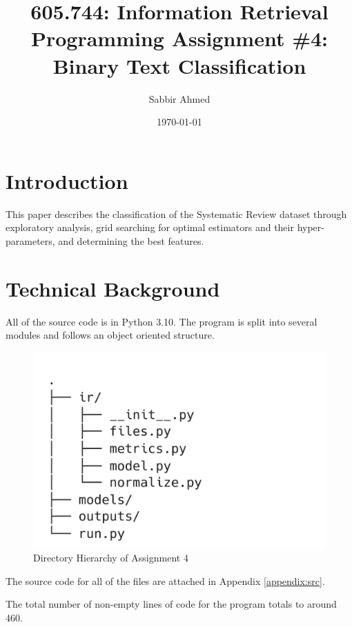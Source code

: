 \documentclass[11pt]{article}
\title{605.744: Information Retrieval \\ Programming Assignment \#4: Binary Text Classification}
\author{Sabbir Ahmed}
\date{\today}
\begin{document}
\maketitle	
\tableofcontents
\clearpage
\newpage

\section{Introduction}
This paper describes the classification of the Systematic Review dataset through exploratory analysis, grid searching for optimal estimators and their hyper-parameters, and determining the best features.

\section{Technical Background}
All of the source code is in Python 3.10. The program is split into several modules and follows an object oriented structure.


\begin{figure}[!ht]
    \centering
    \includegraphics[scale=0.2]{statics/dirtree.png}
    \caption{Directory Hierarchy of Assignment 4}
\end{figure}

The source code for all of the files are attached in Appendix \ref{appendix:src}.

The total number of non-empty lines of code for the program totals to around 460.
\end{document}
